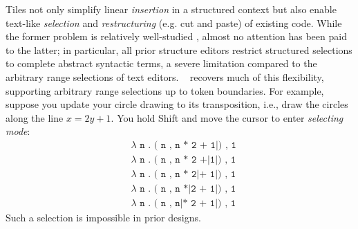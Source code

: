 


Tiles not only simplify linear \emph{insertion} in a structured
context but also enable text-like \emph{selection}
and \emph{restructuring} (e.g. cut and paste) of existing code.
While the former problem is relatively well-studied
,
almost no attention has been paid to the latter;
in particular, all prior structure editors restrict
structured selections to complete abstract syntactic terms,
a severe limitation compared to the arbitrary range
selections of text editors.
\tylr~ recovers much of this flexibility, supporting
arbitrary range selections up to token boundaries.
For example, suppose you update your circle drawing
to its transposition, i.e., draw the circles along
the line $x = 2y + 1$.
You hold Shift and move the cursor to enter \emph{selecting mode}:
\begin{align*}
  & \texttt{$\lambda$ n . ( n , n * 2 + 1|) , 1} \\
  & \texttt{$\lambda$ n . ( n , n * 2 +|1|) , 1} \\
  & \texttt{$\lambda$ n . ( n , n * 2|+ 1|) , 1} \\
  & \texttt{$\lambda$ n . ( n , n *|2 + 1|) , 1} \\
  & \texttt{$\lambda$ n . ( n , n|* 2 + 1|) , 1}
\end{align*}
Such a selection is impossible in prior designs.

